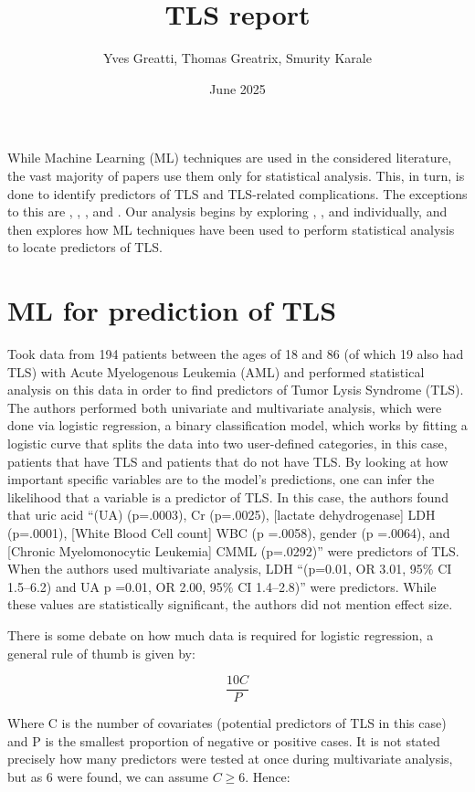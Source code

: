 \documentclass{article}
\title{TLS report}
\author{Yves Greatti, Thomas Greatrix, Smurity Karale}
\date{June 2025}
\begin{document}
\maketitle

While Machine Learning (ML) techniques are used in the considered literature, the vast majority of papers use them only for statistical analysis. This, in turn, is done to identify predictors of TLS and TLS-related complications. The exceptions to this are ,  \cite{montesinos2008tumor}, \cite{mato2004predictive}, and  \cite{xiao2024prediction}. Our analysis begins by exploring \cite{montesinos2008tumor}, \cite{mato2004predictive}, and \cite{xiao2024prediction} individually, and then explores how ML techniques have been used to perform statistical analysis to locate predictors of TLS.

\section{ML for prediction of TLS}

\cite{montesinos2008tumor} Took data from 194 patients between the ages of 18 and 86 (of which 19 also had TLS) with Acute Myelogenous Leukemia (AML) and performed statistical analysis on this data in order to find predictors of Tumor Lysis Syndrome (TLS). The authors performed both univariate and multivariate analysis, which were done via logistic regression, a binary classification model, which works by fitting a logistic curve that splits the data into two user-defined categories, in this case, patients that have TLS and patients that do not have TLS. By looking at how important specific variables are to the model’s predictions, one can infer the likelihood that a variable is a predictor of TLS. In this case, the authors found that uric acid “(UA) (p=.0003), Cr (p=.0025), [lactate dehydrogenase] LDH (p=.0001), [White Blood Cell count] WBC (p =.0058), gender (p =.0064), and [Chronic Myelomonocytic Leukemia] CMML (p=.0292)” were predictors of TLS. When the authors used multivariate analysis, LDH “(p=0.01, OR 3.01, 95\% CI 1.5–6.2) and UA p =0.01, OR 2.00, 95\% CI 1.4–2.8)” were predictors. While these values are statistically significant, the authors did not mention effect size.

There is some debate on how much data is required for logistic regression, a general rule of thumb is given by:

\[\frac{10C}{P}\]

Where C is the number of covariates (potential predictors of TLS in this case) and P is the smallest proportion of negative or positive cases. It is not stated precisely how many predictors were tested at once during multivariate analysis, but as 6 were found, we can assume \(C \geq 6\). Hence:
\end{document}
